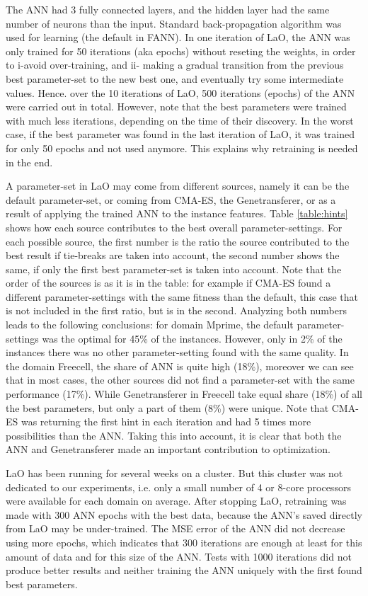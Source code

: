 \documentclass[runningheads,a4paper]{llncs}
\begin{document}
The ANN had 3 fully connected layers, and the hidden layer had the same number of neurons than the input. Standard back-propagation algorithm was used for learning (the default in FANN). In one iteration of LaO, the ANN was only trained for 50 iterations (aka epochs) without reseting the weights, in order to i-avoid over-training, and ii- making a gradual transition from the previous best parameter-set to the new best one, and eventually try some intermediate values. Hence. over the 10 iterations of LaO, 500 iterations (epochs) of the ANN were carried out in total. However, note that the best parameters were trained with much less iterations, depending on the time of their discovery. In the worst case, if the best parameter was found in the last iteration of LaO, it was trained for only 50 epochs and not used anymore. This explains why retraining is needed in the end.

A parameter-set in LaO may come from different sources, namely it can be the default parameter-set, or coming from CMA-ES, the Genetransferer, or as a result of applying the trained ANN to the instance features. Table \ref{table:hints} shows how each source contributes to the best overall parameter-settings. For each possible source, the first number is the ratio the source contributed to the best result if tie-breaks are taken into account, the second number shows the same, if only the first best parameter-set is taken into account. Note that the order of the sources is as it is in the table: for example if CMA-ES found a different parameter-settings with the same fitness than the default, this case that is not included in the first ratio, but is in the second. Analyzing both numbers leads to the following conclusions: for domain Mprime, the default parameter-settings was the optimal for 45\% of the instances. However, only in 2\% of the instances there was no other parameter-setting found with the same quality. In the domain Freecell, the share of ANN is quite high (18\%), moreover we can see that in most cases, the other sources did not find a parameter-set with the same performance (17\%). While Genetransferer in Freecell take equal share (18\%) of all the best parameters, but only a part of them (8\%) were unique. Note that CMA-ES was returning the first hint in each iteration and had 5 times more possibilities than the ANN. Taking this into account, it is clear that both the ANN and Genetransferer made an important contribution to optimization.

LaO has been running for several weeks on a cluster. But this cluster was not dedicated to our experiments, i.e. only a small number of 4 or 8-core processors were available for each domain on average. After stopping LaO, retraining was made with 300 ANN epochs with the best data, because the ANN's saved directly from LaO may be under-trained. The MSE error of the ANN did not decrease using more epochs, which indicates that 300 iterations are enough at least for this amount of data and for this size of the ANN. Tests with 1000 iterations did not produce better results and neither training the ANN uniquely with the first found best parameters.
\end{document}
